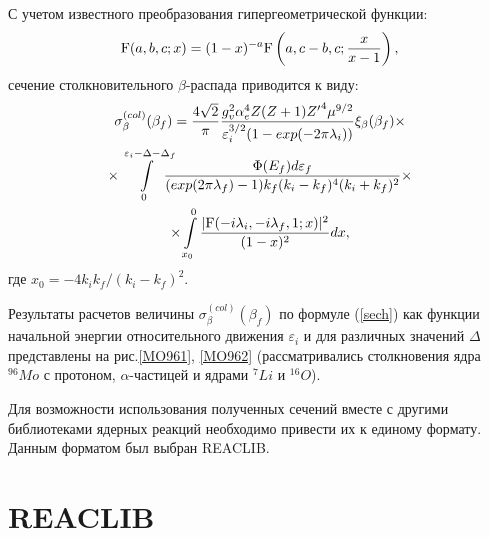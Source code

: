 \documentclass[%
master,    %
natbib,      %
subf,        %
href,        %
colorlinks,  %
]{disser}
\begin{document}
С учетом известного преобразования гипергеометрической функции:
\begin{eqnarray}
{\rm F}(a,b,c;x)=(1-x)^{-a}{\rm F}\left(a,c-b,c;{x\over{x-1}}\right),\nonumber
\end{eqnarray}
сечение столкновительного $\beta$-распада  приводится к виду:
\begin{multline} \label{sech}
\sigma^{(col)}_\beta(\beta_f)=
{4\sqrt{2}\over \pi} {{g^2_v\alpha_e^4Z (Z+1) {Z'}^4 \mu^{9/2}}
	\over{\varepsilon_i^{3/2} (1-exp(-2\pi\lambda_i))}}
\xi_\beta(\beta_f)
\times\\
\times\int\limits_0^{\varepsilon_i{-}\Delta{-}\Delta_f}\!\!\!\!\!
{{\Phi(E_f) d\varepsilon_f}\over{(exp(2\pi\lambda_f)-1)
		k_f ( k_i- k_f)^4(k_i+k_f)^2}}\times\\
\times\int\limits_{x_0}^0 {{|{\rm F}(-i \lambda_i, -i\lambda_f,1; x)|^2}\over{(1-x)^2}} dx,
\end{multline}
где  $x_0=-4 k_i k_f/(k_i- k_f)^2$.


Результаты расчетов величины    $\sigma^{(col)}_\beta(\beta_f)$
по формуле (\ref{sech}) как функции начальной энергии относительного движения
$\varepsilon_i$ и для различных значений $\Delta$  представлены на рис.\ref{MO961}, \ref{MO962}
(рассматривались столкновения ядра $^{96} Mo$ с протоном, $\alpha$-частицей
и ядрами $^7 Li$ и $^{16} O$).

Для возможности использования полученных сечений вместе с другими библиотеками ядерных реакций необходимо привести их к единому формату. Данным форматом был выбран REACLIB.

\section{REACLIB}
\end{document}
